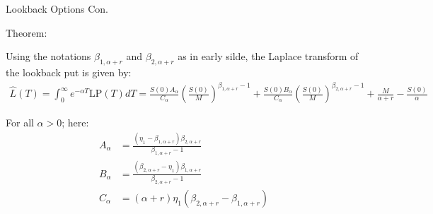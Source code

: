 \documentclass{beamer}
\begin{document}
\begin{frame}{Lookback Options Con.}

    \par Theorem:
    {\footnotesize \footnotesize
    
    \vspace{1em}
    \par Using the notations \(\beta_{1,\alpha+r}\) 
    and \(\beta_{2,\alpha+r}\) as in early silde, the Laplace transform of the lookback put is given by:
    \vspace{1em}
    {\footnotesize \tiny
    \begin{align*}
        \hat{L}(T) = \int_0^\infty e^{-\alpha T} \mathrm{LP}(T)  dT = \frac{S(0)A_\alpha}{C_\alpha} \left( \frac{S(0)}{M} \right)^{\beta_{1,\alpha+r}-1} 
        + \frac{S(0)B_\alpha}{C_\alpha} \left( \frac{S(0)}{M} \right)^{\beta_{2,\alpha+r}-1}  
        + \frac{M}{\alpha+r} - \frac{S(0)}{\alpha}
    \end{align*}
    }
    \vspace{1em}
    \par For all \(\alpha > 0\); here:
    \vspace{1em}
    \begin{align*}
        A_\alpha &= \frac{(\eta_1 - \beta_{1,\alpha+r}) \beta_{2,\alpha+r}}{\beta_{1,\alpha+r} - 1} \\
        B_\alpha &= \frac{(\beta_{2,\alpha+r} - \eta_1) \beta_{1,\alpha+r}}{\beta_{2,\alpha+r} - 1}\\
        C_\alpha &= (\alpha + r) \eta_1 (\beta_{2,\alpha+r} - \beta_{1,\alpha+r})
    \end{align*}

    }
    
\end{frame}
\end{document}

